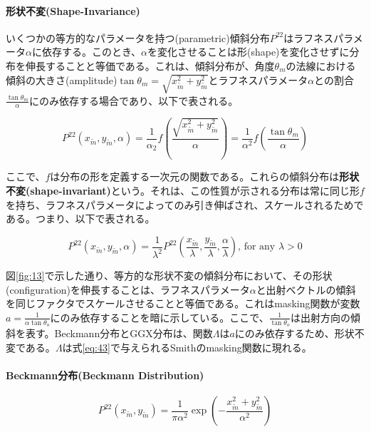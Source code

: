 \documentclass[a4j,xelatex,ja=standard]{bxjsarticle}
\begin{document}
\paragraph{形状不変(Shape-Invariance)}

いくつかの等方的なパラメータを持つ(parametric)傾斜分布$P^{22}$はラフネスパラメータ$\alpha$に依存する。このとき、$\alpha$を変化させることは形(shape)を変化させずに分布を伸長することと等価である。これは、傾斜分布が、角度$\theta_m$の法線における傾斜の大きさ(amplitude)$\tan\theta_m = \sqrt{x_{\tilde{m}}^2 + y_{\tilde{m}}^2}$とラフネスパラメータ$\alpha$との割合$\frac{\tan\theta_m}{\alpha}$にのみ依存する場合であり、以下で表される。

\begin{equation}
    P^{22}(x_{\tilde{m}}, y_{\tilde{m}}, \alpha) = \frac{1}{\alpha_2} f \left( \frac{\sqrt{x_{\tilde{m}}^2 + y_{\tilde{m}}^2}}{\alpha} \right) = \frac{1}{\alpha^2} f \left( \frac{\tan\theta_m}{\alpha} \right)
    \label{eq:65}
\end{equation}

ここで、$f$は分布の形を定義する一次元の関数である。これらの傾斜分布は\textbf{形状不変(shape-invariant)}という。それは、この性質が示される分布は常に同じ形$f$を持ち、ラフネスパラメータによってのみ引き伸ばされ、スケールされるためである。つまり、以下で表される。

\begin{equation}
    P^{22}(x_{\tilde{m}}, y_{\tilde{m}}, \alpha) = \frac{1}{\lambda^2} P^{22}(\frac{x_{\tilde{m}}}{\lambda}, \frac{y_{\tilde{m}}}{\lambda}, \frac{\alpha}{\lambda}) \text{, for any } \lambda > 0
    \label{eq:66}
\end{equation}

図\ref{fig:13}で示した通り、等方的な形状不変の傾斜分布において、その形状(configuration)を伸長することは、ラフネスパラメータ$\alpha$と出射ベクトルの傾斜を同じファクタでスケールさせることと等価である。これはmasking関数が変数$a = \frac{1}{\alpha\tan\theta_o}$にのみ依存することを暗に示している。ここで、$\frac{1}{\tan\theta_o}$は出射方向の傾斜を表す。Beckmann分布とGGX分布は、関数$\Lambda$は$a$にのみ依存するため、形状不変である。$\Lambda$は式\eqref{eq:43}で与えられるSmithのmasking関数に現れる。

\paragraph{Beckmann分布(Beckmann Distribution)}

\begin{equation}
    P^{22}(x_{\tilde{m}}, y_{\tilde{m}}) = \frac{1}{\pi\alpha^2} \exp\left( -\frac{x_{\tilde{m}}^2 + y_{\tilde{m}}^2}{\alpha^2} \right)
    \label{eq:67}
\end{equation}
\end{document}
